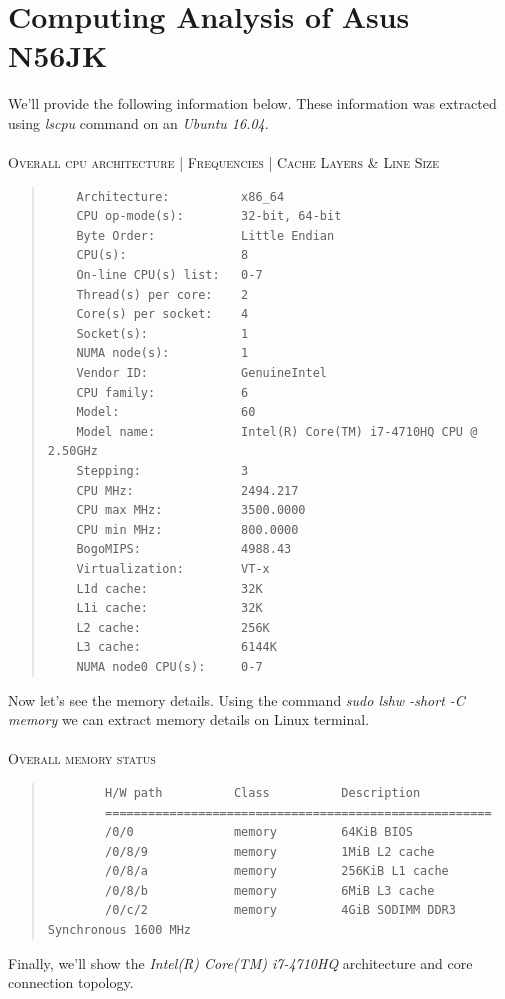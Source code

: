 \documentclass[12pt]{article}
\numberwithin{equation}{section}
\numberwithin{table}{section}
\numberwithin{figure}{section}
\begin{document}
\section{Computing Analysis of Asus N56JK}
We'll provide the following information below. These information was extracted using \textit{lscpu} command on an \textit{Ubuntu 16.04}.\\
\\
\textsc{Overall cpu architecture | Frequencies | Cache Layers \& Line Size}
\begin{quote}
	\begin{verbatim}
	Architecture:          x86_64
	CPU op-mode(s):        32-bit, 64-bit
	Byte Order:            Little Endian
	CPU(s):                8
	On-line CPU(s) list:   0-7
	Thread(s) per core:    2
	Core(s) per socket:    4
	Socket(s):             1
	NUMA node(s):          1
	Vendor ID:             GenuineIntel
	CPU family:            6
	Model:                 60
	Model name:            Intel(R) Core(TM) i7-4710HQ CPU @ 2.50GHz
	Stepping:              3
	CPU MHz:               2494.217
	CPU max MHz:           3500.0000
	CPU min MHz:           800.0000
	BogoMIPS:              4988.43
	Virtualization:        VT-x
	L1d cache:             32K
	L1i cache:             32K
	L2 cache:              256K
	L3 cache:              6144K
	NUMA node0 CPU(s):     0-7
	\end{verbatim}
\end{quote}
Now let's see the memory details. Using the command \textit{sudo lshw -short -C memory} we can extract memory details on Linux terminal.\\
\\
\textsc{Overall memory status}
\begin{quote}
	\begin{verbatim}
		H/W path          Class          Description
		======================================================
		/0/0              memory         64KiB BIOS
		/0/8/9            memory         1MiB L2 cache
		/0/8/a            memory         256KiB L1 cache
		/0/8/b            memory         6MiB L3 cache
		/0/c/2            memory         4GiB SODIMM DDR3 Synchronous 1600 MHz
	\end{verbatim}
\end{quote}
\newpage
Finally, we'll show the \textit{Intel(R) Core(TM) i7-4710HQ} architecture and core connection topology.
\end{document}
